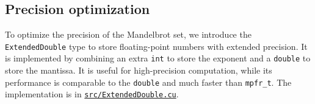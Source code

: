 \subsection{Precision optimization}\label{subsec:precision-optimization}

To optimize the precision of the Mandelbrot set, we introduce the \texttt{ExtendedDouble}
type to store floating-point numbers with extended precision.
It is implemented by combining an extra \texttt{int} to store the exponent and a \texttt{double}
to store the mantissa.
It is useful for high-precision computation, while its performance is comparable to the \texttt{double}
and much faster than \texttt{mpfr\_t}.
The implementation is in \href{https://github.com/AI1379/MandelbrotSet/blob/master/src/ExtendedDouble.cu}
{\texttt{src/ExtendedDouble.cu}}.